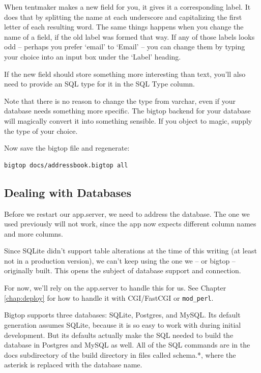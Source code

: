 When tentmaker makes a new field for you, it gives it a corresponding
label.  It does that by splitting the name at each underscore
and capitalizing the first letter of each resulting word.
The same things happens when you change the name of a field, if the
old label was formed that way.  If any of those labels looks odd -- perhaps
you prefer `email' to `Email' -- you can change them by typing your choice
into an input box under the `Label' heading.

If the new field should store something more interesting than text, you'll
also need to provide an SQL type for it in the SQL Type column.

Note that there is no reason to change the type from varchar, even if
your database needs something more specific.  The bigtop backend for your
database will magically convert it into something sensible.  If you object
to magic, supply the type of your choice.

Now save the bigtop file and regenerate:

\begin{verbatim}
bigtop docs/addressbook.bigtop all
\end{verbatim}

\subsection*{Dealing with Databases}

Before we restart our app.server, we need to address the database.
The one we used previously will not work, since the app now expects
different column names and more columns.

Since SQLite didn't support table alterations at the time of this writing
(at least not in a production version), we can't keep using the one we
-- or bigtop -- originally built.  This opens the subject of database
support and connection.

For now, we'll rely on the app.server to handle this for us.  See Chapter
\ref{chap:deploy} for how to handle it with CGI/FastCGI or \verb+mod_perl+.

Bigtop supports three databases:
SQLite, Postgres, and MySQL.  Its default generation assumes SQLite,
because it is so easy to work with during initial development.
But its defaults actually make the SQL needed to build the database in
Postgres and MySQL as well.  All of the SQL commands are in the
docs subdirectory of the build directory in files called schema.*,
where the asterisk is replaced with the database name.


